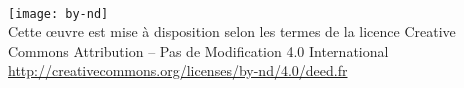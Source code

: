 \
\vfill 
\begin{center}
	\texttt{[image: by-nd]}\\[1em]
	Cette œuvre est mise à disposition selon les termes de la licence Creative Commons Attribution -- Pas de Modification 4.0 International \url{http://creativecommons.org/licenses/by-nd/4.0/deed.fr}
\end{center}